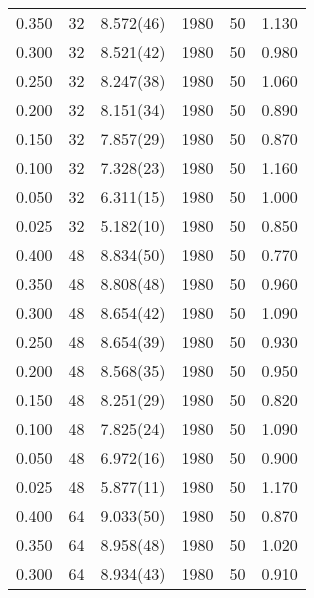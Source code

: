 \begin{tabular}{rrlrrr}
 0.350 &      32 & 8.572(46)  &                 1980 &                   50 &    1.130 \\
 0.300 &      32 & 8.521(42)  &                 1980 &                   50 &    0.980 \\
 0.250 &      32 & 8.247(38)  &                 1980 &                   50 &    1.060 \\
 0.200 &      32 & 8.151(34)  &                 1980 &                   50 &    0.890 \\
 0.150 &      32 & 7.857(29)  &                 1980 &                   50 &    0.870 \\
 0.100 &      32 & 7.328(23)  &                 1980 &                   50 &    1.160 \\
 0.050 &      32 & 6.311(15)  &                 1980 &                   50 &    1.000 \\
 0.025 &      32 & 5.182(10)  &                 1980 &                   50 &    0.850 \\
 0.400 &      48 & 8.834(50)  &                 1980 &                   50 &    0.770 \\
 0.350 &      48 & 8.808(48)  &                 1980 &                   50 &    0.960 \\
 0.300 &      48 & 8.654(42)  &                 1980 &                   50 &    1.090 \\
 0.250 &      48 & 8.654(39)  &                 1980 &                   50 &    0.930 \\
 0.200 &      48 & 8.568(35)  &                 1980 &                   50 &    0.950 \\
 0.150 &      48 & 8.251(29)  &                 1980 &                   50 &    0.820 \\
 0.100 &      48 & 7.825(24)  &                 1980 &                   50 &    1.090 \\
 0.050 &      48 & 6.972(16)  &                 1980 &                   50 &    0.900 \\
 0.025 &      48 & 5.877(11)  &                 1980 &                   50 &    1.170 \\
 0.400 &      64 & 9.033(50)  &                 1980 &                   50 &    0.870 \\
 0.350 &      64 & 8.958(48)  &                 1980 &                   50 &    1.020 \\
 0.300 &      64 & 8.934(43)  &                 1980 &                   50 &    0.910 \\

\end{tabular}
